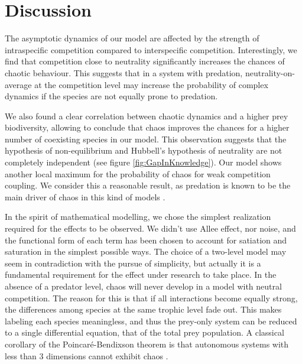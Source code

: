 \section{Discussion}
\label{sec:Discussion}
The asymptotic dynamics of our model are affected by the strength of intraspecific competition compared to interspecific competition. Interestingly, we find that competition close to neutrality significantly increases the chances of chaotic behaviour. This suggests that in a system with predation, neutrality-on-average at the competition level may increase the probability of complex dynamics if the species are not equally prone to predation.

We also found a clear correlation between chaotic dynamics and a higher prey biodiversity, allowing to conclude that chaos improves the chances for a higher number of coexisting species in our model. This observation suggests that the hypothesis of non-equilibrium \citep{Huisman1999} and Hubbell's hypothesis of neutrality are not completely independent (see figure \ref{fig:GapInKnowledge}). Our model shows another local maximum for the probability of chaos for weak competition coupling. We consider this a reasonable result, as predation is known to be the main driver of chaos in this kind of models \citep{Scheffer2004}.

In the spirit of mathematical modelling, we chose the simplest realization required for the effects to be observed. We didn't use Allee effect, nor noise, and the functional form of each term has been chosen to account for satiation and saturation in the simplest possible ways. The choice of a two-level model may seem in contradiction with the pursue of simplicity, but actually it is a fundamental requirement for the effect under research to take place. In the absence of a predator level, chaos will never develop in a model with neutral competition. The reason for this is that if all interactions become equally strong, the differences among species at the same trophic level fade out. This makes labeling each species meaningless, and thus the prey-only system can be reduced to a single differential equation, that of the total prey population. A classical corollary of the Poincaré-Bendixson theorem is that autonomous systems with less than $3$ dimensions cannot exhibit chaos \citep{Strogatz1994}.

